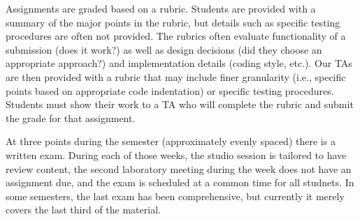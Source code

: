 Assignments are graded based on a rubric.  Students are provided with a summary of the major points in the rubric, but details such as specific testing procedures are often not provided.  The rubrics often evaluate functionality of a submission (does it work?) as well as design decisions (did they choose an appropriate approach?) and implementation details (coding style, etc.). Our TAs are then provided with a rubric that may include finer granularity (i.e., specific points based on appropriate code indentation) or specific testing procedures. Students must show their work to a TA who will complete the rubric and submit the grade for that assignment.

At three points during the semester (approximately evenly spaced) there is a written exam.  During each of those weeks, the studio session is tailored to have review content, the second laboratory meeting during the week does not have an assignment due, and the
exam is scheduled at a common time for all studnets.  In some semesters, the last exam has been comprehensive, but currently it merely covers the last third of the material.
